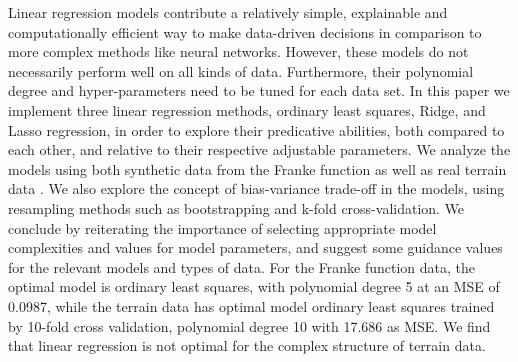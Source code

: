 Linear regression models contribute a relatively simple, explainable and computationally efficient way to make data-driven decisions in comparison to more complex methods like neural networks.
However, these models do not necessarily perform well on all kinds of data.
Furthermore, their polynomial degree and hyper-parameters need to be tuned for each data set.
In this paper we implement three linear regression methods, ordinary least squares, Ridge, and Lasso regression, in order to explore their predicative abilities, both compared to each other, and relative to their respective adjustable parameters. 
We analyze the models using both synthetic data from the Franke function \citep[p. 13]{frank} as well as real terrain data \cite{mortengithub}.
We also explore the concept of bias-variance trade-off in the models, using resampling methods such as bootstrapping and k-fold cross-validation.
We conclude by reiterating the importance of selecting appropriate model complexities and values for model parameters, and suggest some guidance values for the relevant models and types of data. 
For the Franke function data, the optimal model is ordinary least squares, with polynomial degree 5 at an MSE of 0.0987, while the terrain data has optimal model ordinary least squares trained by 10-fold cross validation, polynomial degree 10 with 17.686 as MSE.
We find that linear regression is not optimal for the complex structure of terrain data. 